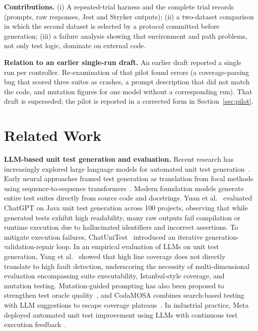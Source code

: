\documentclass[11pt]{article}
\begin{document}
\textbf{Contributions.} (i) A repeated-trial harness and the complete trial records (prompts, raw responses, Jest and Stryker outputs); (ii) a two-dataset comparison in which the second dataset is selected by a protocol committed before generation; (iii) a failure analysis showing that environment and path problems, not only test logic, dominate on external code.

\textbf{Relation to an earlier single-run draft.} An earlier draft reported a single run per controller. Re-examination of that pilot found errors (a coverage-parsing bug that scored three suites as crashes, a prompt description that did not match the code, and mutation figures for one model without a corresponding run). That draft is superseded; the pilot is reported in a corrected form in Section~\ref{sec:pilot}.

\section{Related Work}

\textbf{LLM-based unit test generation and evaluation.}
Recent research has increasingly explored large language models for automated unit test generation~\cite{wang2024survey}. Early neural approaches framed test generation as translation from focal methods using sequence-to-sequence transformers~\cite{tufano2020transformers}. Modern foundation models generate entire test suites directly from source code and docstrings. Yuan et al.~\cite{yuan2023chatgpt} evaluated ChatGPT on Java unit test generation across 100 projects, observing that while generated tests exhibit high readability, many raw outputs fail compilation or runtime execution due to hallucinated identifiers and incorrect assertions. To mitigate execution failures, ChatUniTest~\cite{xie2023chatunitest} introduced an iterative generation-validation-repair loop. In an empirical evaluation of LLMs on unit test generation, Yang et al.~\cite{yang2024evaluation} showed that high line coverage does not directly translate to high fault detection, underscoring the necessity of multi-dimensional evaluation encompassing suite executability, Istanbul-style coverage, and mutation testing. Mutation-guided prompting has also been proposed to strengthen test oracle quality~\cite{dakhel2024mutap}, and CodaMOSA combines search-based testing with LLM suggestions to escape coverage plateaus~\cite{lemieux2023codamosa}. In industrial practice, Meta deployed automated unit test improvement using LLMs with continuous test execution feedback~\cite{alshahwan2024meta}.
\end{document}
